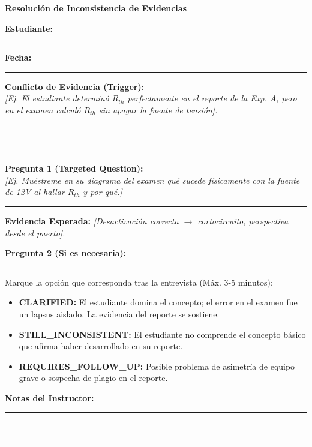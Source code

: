 \documentclass[11pt, a4paper]{article}
\begin{document}
\begin{tcolorbox}[colback=ucbblue!5!white, colframe=ucbblue, title=\textbf{Registro Selectivo de Microdefensa (Path B)}]
    \centering \textbf{Resolución de Inconsistencia de Evidencias}
\end{tcolorbox}

\textbf{Estudiante:} \rule{5cm}{0.4pt} \quad \textbf{Fecha:} \rule{4cm}{0.4pt}

\vspace{0.4cm}
\noindent\textbf{Conflicto de Evidencia (Trigger):} \\
\textit{[Ej. El estudiante determinó $R_{th}$ perfectamente en el reporte de la Exp. A, pero en el examen calculó $R_{th}$ sin apagar la fuente de tensión].} \\
\rule{\textwidth}{0.4pt} \\
\rule{\textwidth}{0.4pt}

\vspace{0.4cm}
\noindent\textbf{Pregunta 1 (Targeted Question):} \\
\textit{[Ej. Muéstreme en su diagrama del examen qué sucede físicamente con la fuente de 12V al hallar $R_{th}$ y por qué.]} \\
\rule{\textwidth}{0.4pt}

\vspace{0.2cm}
\noindent\textbf{Evidencia Esperada:} \textit{[Desactivación correcta $\rightarrow$ cortocircuito, perspectiva desde el puerto].}

\vspace{0.4cm}
\noindent\textbf{Pregunta 2 (Si es necesaria):} \\
\rule{\textwidth}{0.4pt}

\vspace{0.6cm}
\begin{tcolorbox}[colback=gray!5, colframe=gray!50, title=\textbf{Resolución (Outcome)}]
Marque la opción que corresponda tras la entrevista (Máx. 3-5 minutos):
\begin{itemize}
    \item[$\square$] \textbf{CLARIFIED:} El estudiante domina el concepto; el error en el examen fue un lapsus aislado. La evidencia del reporte se sostiene.
    \item[$\square$] \textbf{STILL\_INCONSISTENT:} El estudiante no comprende el concepto básico que afirma haber desarrollado en su reporte.
    \item[$\square$] \textbf{REQUIRES\_FOLLOW\_UP:} Posible problema de asimetría de equipo grave o sospecha de plagio en el reporte.
\end{itemize}
\end{tcolorbox}

\noindent\textbf{Notas del Instructor:} \\
\rule{\textwidth}{0.4pt} \\
\rule{\textwidth}{0.4pt}
\end{document}

